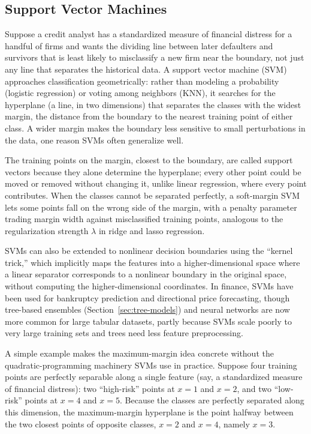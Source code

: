 \documentclass[../ai_in_finance]{subfiles}
\begin{document}
\subsection{Support Vector Machines}

Suppose a credit analyst has a standardized measure of financial distress for a handful of firms and wants the dividing line between later defaulters and survivors that is least likely to misclassify a new firm near the boundary, not just any line that separates the historical data. A support vector machine (SVM) approaches classification geometrically: rather than modeling a probability (logistic regression) or voting among neighbors (KNN), it searches for the hyperplane (a line, in two dimensions) that separates the classes with the widest margin, the distance from the boundary to the nearest training point of either class. A wider margin makes the boundary less sensitive to small perturbations in the data, one reason SVMs often generalize well.

The training points on the margin, closest to the boundary, are called support vectors because they alone determine the hyperplane; every other point could be moved or removed without changing it, unlike linear regression, where every point contributes. When the classes cannot be separated perfectly, a soft-margin SVM lets some points fall on the wrong side of the margin, with a penalty parameter trading margin width against misclassified training points, analogous to the regularization strength $\lambda$ in ridge and lasso regression.

SVMs can also be extended to nonlinear decision boundaries using the ``kernel trick,'' which implicitly maps the features into a higher-dimensional space where a linear separator corresponds to a nonlinear boundary in the original space, without computing the higher-dimensional coordinates. In finance, SVMs have been used for bankruptcy prediction and directional price forecasting, though tree-based ensembles (Section~\ref{sec:tree-models}) and neural networks are now more common for large tabular datasets, partly because SVMs scale poorly to very large training sets and trees need less feature preprocessing.

A simple example makes the maximum-margin idea concrete without the quadratic-programming machinery SVMs use in practice. Suppose four training points are perfectly separable along a single feature (say, a standardized measure of financial distress): two ``high-risk'' points at $x=1$ and $x=2$, and two ``low-risk'' points at $x=4$ and $x=5$. Because the classes are perfectly separated along this dimension, the maximum-margin hyperplane is the point halfway between the two closest points of opposite classes, $x=2$ and $x=4$, namely $x=3$.
\end{document}
